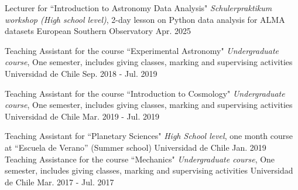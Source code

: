 
\vspace{10pt}
\begin{cvhonors}
    \cvhonor
	{Lecturer for ``Introduction to Astronomy Data Analysis"} %
	{\textit{Schulerpraktikum workshop (High school level)}, 2-day lesson on Python data analysis for ALMA datasets} %
	{European Southern Observatory} %
	{Apr. 2025} %

	\cvhonor
	{Teaching Assistant for the course ``Experimental Astronomy"} %
	{\textit{Undergraduate course}, One semester, includes giving classes, marking and supervising activities} %
	{Universidad de Chile} %
	{Sep. 2018 - Jul. 2019} %
	
	\cvhonor
	{Teaching Assistant for the course ``Introduction to Cosmology"} %
	{\textit{Undergraduate course}, One semester, includes giving classes, marking and supervising activities} %
	{Universidad de Chile} %
	{Mar. 2019 - Jul. 2019} %
	
	\cvhonor
	{Teaching Assistant for ``Planetary Sciences"} %
	{\textit{High School level}, one month course at ``Escuela de Verano'' (Summer school)} %
	{Universidad de Chile} %
	{Jan. 2019} %
%	
%	
	\cvhonor
	{Teaching Assistance for the course ``Mechanics"} %
	{\textit{Undergraduate course}, One semester, includes giving classes, marking and supervising activities} %
	{Universidad de Chile} %
	{Mar. 2017 - Jul. 2017} %
	
\end{cvhonors}
